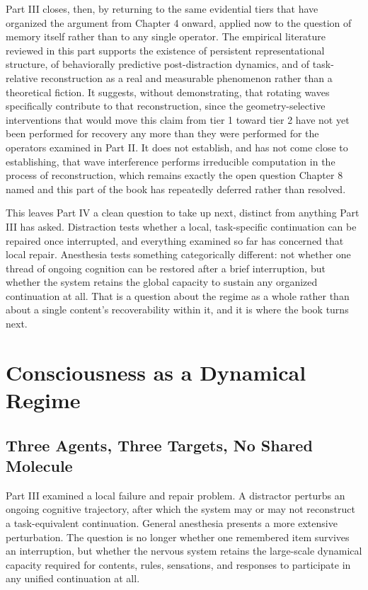\documentclass[11pt]{book}
\begin{document}
Part III closes, then, by returning to the same evidential tiers that have organized the argument from Chapter 4 onward, applied now to the question of memory itself rather than to any single operator. The empirical literature reviewed in this part supports the existence of persistent representational structure, of behaviorally predictive post-distraction dynamics, and of task-relative reconstruction as a real and measurable phenomenon rather than a theoretical fiction. It suggests, without demonstrating, that rotating waves specifically contribute to that reconstruction, since the geometry-selective interventions that would move this claim from tier 1 toward tier 2 have not yet been performed for recovery any more than they were performed for the operators examined in Part II. It does not establish, and has not come close to establishing, that wave interference performs irreducible computation in the process of reconstruction, which remains exactly the open question Chapter 8 named and this part of the book has repeatedly deferred rather than resolved.

This leaves Part IV a clean question to take up next, distinct from anything Part III has asked. Distraction tests whether a local, task-specific continuation can be repaired once interrupted, and everything examined so far has concerned that local repair. Anesthesia tests something categorically different: not whether one thread of ongoing cognition can be restored after a brief interruption, but whether the system retains the global capacity to sustain any organized continuation at all. That is a question about the regime as a whole rather than about a single content's recoverability within it, and it is where the book turns next.

\part{Consciousness as a Dynamical Regime}

\chapter{Three Agents, Three Targets, No Shared Molecule}

Part III examined a local failure and repair problem. A distractor perturbs an ongoing cognitive trajectory, after which the system may or may not reconstruct a task-equivalent continuation. General anesthesia presents a more extensive perturbation. The question is no longer whether one remembered item survives an interruption, but whether the nervous system retains the large-scale dynamical capacity required for contents, rules, sensations, and responses to participate in any unified continuation at all.
\end{document}
